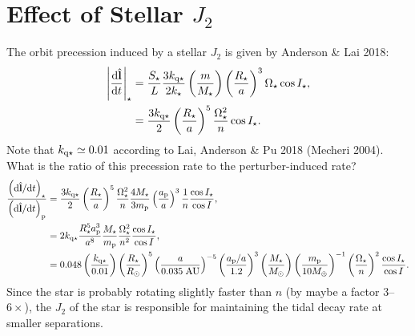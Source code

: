 \documentclass[11pt,
        usenames, %
        dvipsnames %
    ]{article}
\newcommand*{\rd}[2]{\frac{\mathrm{d}#1}{\mathrm{d}#2}}
\newcommand*{\rdil}[2]{\mathrm{d}#1 / \mathrm{d}#2}
\newcommand*{\bm}[1]{\boldsymbol{\mathbf{#1}}}
\newcommand*{\uv}[1]{\hat{\bm{#1}}}
\newcommand*{\abs}[1]{\left|#1\right|}
\newcommand*{\p}[1]{\left(#1\right)}
\begin{document}
\clearpage

\section{Effect of Stellar $J_2$}

The orbit precession induced by a stellar $J_2$ is given by Anderson \& Lai
2018:
\begin{align}
    \abs{\rd{\uv{l}}{t}}_{\star} &= \frac{S_\star}{L}
            \frac{3 k_{\rm q\star}}{2k_\star}
            \p{\frac{m}{M_\star}}
            \p{\frac{R_\star}{a}}^3
            \Omega_{\star} \cos I_\star,\\
        &= \frac{3k_{\rm q \star}}{2} \p{\frac{R_\star}{a}}^5
            \frac{\Omega_{\rm \star}^2}{n} \cos I_\star.
            \label{eq:lai_starprec}
\end{align}
Note that $k_{\rm q\star} \simeq 0.01$ according to Lai, Anderson \& Pu 2018
(Mecheri 2004). What is the ratio of this precession rate to the
perturber-induced rate?
\begin{align}
    \frac{\p{\rdil{\uv{l}}{t}}_\star}{\p{\rdil{\uv{l}}{t}}_{\rm p}}
        &= \frac{3k_{\rm q\star}}{2}\p{\frac{R_\star}{a}}^5
            \frac{\Omega_\star^2}{n} \frac{4 M_\star}{3m_{\rm p}}
                \p{\frac{a_{\rm p}}{a}}^3 \frac{1}{n}
                \frac{\cos I_\star}{\cos I},\\
        &= 2k_{\rm q \star} \frac{R_\star^5 a_{\rm p}^3}{a^8}
            \frac{M_\star}{m_{\rm p}}\frac{\Omega_{\rm \star}^2}{n^2}
            \frac{\cos I_\star}{\cos I},\\
        &= 0.048
            \p{\frac{k_{\rm q \star}}{0.01}}
            \p{\frac{R_\star}{R_{\odot}}}^5
            \p{\frac{a}{0.035\;\mathrm{AU}}}^{-5}
            \p{\frac{a_{\rm p} / a}{1.2}}^3
            \p{\frac{M_\star}{M_{\odot}}}
            \p{\frac{m_{\rm p}}{10 M_{\oplus}}}^{-1}
            \p{\frac{\Omega_{\star}}{n}}^2
            \frac{\cos I_\star}{\cos I}.
\end{align}
Since the star is probably rotating slightly faster than $n$ (by maybe a factor
$3$--$6\times$), the $J_2$ of the star is responsible for maintaining the tidal
decay rate at smaller separations.
\end{document}
